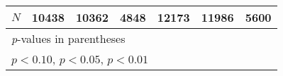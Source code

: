 \documentclass[11pt, letterpaper]{article}
\begin{document}
{\begin{tabular}{l*{6}{c}}
\hline
\(N\)       &       10438         &       10362         &        4848         &       12173         &       11986         &        5600         \\
\hline\hline
\multicolumn{7}{l}{\footnotesize \textit{p}-values in parentheses}\\
\multicolumn{7}{l}{\footnotesize \sym{*} \(p<0.10\), \sym{**} \(p<0.05\), \sym{***} \(p<0.01\)}\\
\end{tabular}
}
\end{document}
